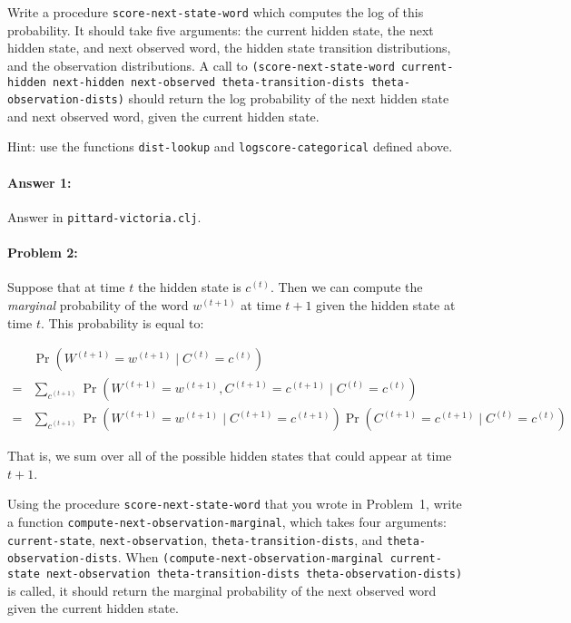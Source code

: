\documentclass[10pt]{article}
\begin{document}
  Write a procedure \texttt{score-next-state-word} which computes the
  log of this probability. It should take five arguments: the current
  hidden state, the next hidden state, and next observed word, the
  hidden state transition distributions, and the observation
  distributions. A call to \texttt{(score-next-state-word
    current-hidden next-hidden next-observed theta-transition-dists
    theta-observation-dists)} should return the log probability of the
  next hidden state and next observed word, given the current hidden
  state.

  \noindent Hint: use the functions \texttt{dist-lookup} and
  \texttt{logscore-categorical} defined above.

\paragraph{Answer 1:} Answer in
\texttt{pittard-victoria.clj}.


\hrulefill
\paragraph{Problem 2:}

Suppose that at time $t$ the hidden state is $c^{(t)}$. Then we can
compute the \emph{marginal} probability of the word $w^{(t+1)}$ at
time $t+1$ given the hidden state at time $t$. This probability is
equal to:

\begin{align}
&\Pr(W^{(t+1)} = w^{(t+1)} \mid C^{(t)} = c^{(t)}) \\ 
=&\sum_{c^{(t+1)}} \Pr(W^{(t+1)} = w^{(t+1)}, C^{(t+1)} =c^{(t+1)} \mid C^{(t)} = c^{(t)})\\
=&\sum_{c^{(t+1)}} \Pr(W^{(t+1)} = w^{(t+1)} \mid C^{(t+1)}=c^{(t+1)}) \Pr(C^{(t+1)} =c^{(t+1)} \mid C^{(t)} = c^{(t)})
\end{align}

That is, we sum over all of the possible hidden states that could
appear at time $t+1$.

Using the procedure \texttt{score-next-state-word} that you wrote in
Problem~1, write a function
\texttt{compute-next-observation-marginal}, which takes four
arguments: \texttt{current-state}, \texttt{next-observation},
\texttt{theta-transition-dists}, and
\texttt{theta-observation-dists}. When
\texttt{(compute-next-observation-marginal current-state
  next-observation theta-transition-dists theta-observation-dists)} is
called, it should return the marginal probability of the next observed
word given the current hidden state.
\end{document}
